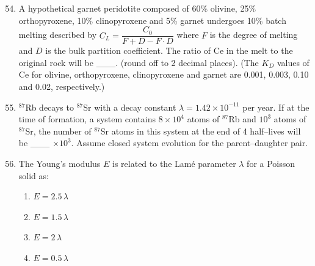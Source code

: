 \documentclass[journal,12pt,onecolumn]{IEEEtran}
\theoremstyle{remark}
\begin{document}
\begin{enumerate}
\setcounter{enumi}{53}

\item A hypothetical garnet peridotite composed of 60\% olivine, 25\% orthopyroxene, 10\% clinopyroxene and 5\% garnet undergoes 10\% batch melting described by  
$C_L = \dfrac{C_0}{F + D - F \cdot D}$  
where $F$ is the degree of melting and $D$ is the bulk partition coefficient.  
The ratio of Ce in the melt to the original rock will be \_\_\_. (round off to 2 decimal places).  
(The $K_D$ values of Ce for olivine, orthopyroxene, clinopyroxene and garnet are 0.001, 0.003, 0.10 and 0.02, respectively.)  
\vspace{0.5cm}

\item $^{87}$Rb decays to $^{87}$Sr with a decay constant $\lambda = 1.42 \times 10^{-11}$ per year. If at the time of formation, a system contains $8 \times 10^{4}$ atoms of $^{87}$Rb and $10^{3}$ atoms of $^{87}$Sr, the number of $^{87}$Sr atoms in this system at the end of 4 half--lives will be \_\_\_ $\times 10^{3}$.  
Assume closed system evolution for the parent--daughter pair.  
\vspace{0.5cm}

\item The Young's modulus $E$ is related to the Lamé parameter $\lambda$ for a Poisson solid as:  
\begin{multicols}{4}
\begin{enumerate}
\item $E = 2.5\,\lambda$
\item $E = 1.5\,\lambda$
\item $E = 2\,\lambda$
\item $E = 0.5\,\lambda$
\end{enumerate}
\end{multicols}

\end{enumerate}
\end{document}

